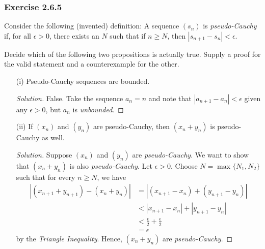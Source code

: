 \subsubsection{Exercise 2.6.5} Consider the following (invented) definition: A sequence \((s_n)\) is \textit{pseudo-Cauchy} if, for all \(\epsilon > 0\), there exists an \(N \) such that if \(n \geq N \), then \( |s_{n+1} - s_n | < \epsilon\). 

Decide which of the following two propositions is actually true. Supply a proof for the valid statement and a counterexample for the other.
\begin{enumerate}
    \item[(i)] Pseudo-Cauchy sequences are bounded. 
        \begin{proof}[Solution]
            False. Take the sequence \(a_n = n \) and note that \( |a_{n+1} - a_n| < \epsilon\) given any \(\epsilon > 0 \), but \(a_n \) is \textit{unbounded}.
        \end{proof}
    \item[(ii)] If \((x_n)\) and \((y_n)\) are pseudo-Cauchy, then \((x_n + y_n)\) is pseudo-Cauchy as well. 
    \begin{proof}[Solution]
        Suppose \((x_n)\) and \((y_n)\) are \textit{pseudo-Cauchy}. We want to show that \((x_n + y_n)\) is also \textit{pseudo-Cauchy}. Let \(\epsilon > 0\). Choose \( N = \max \{ N_1, N_2 \}\) such that for every \( n \geq N \), we have 
        \begin{align*}
            |(x_{n+1} + y_{n+1}) - (x_n + y_n)| &= |(x_{n+1} - x_n) + (y_{n+1} - y_n) | \\
                                                &< |x_{n+1} - x_n| + |y_{n+1} - y_n| \\
                                                &< \frac{\epsilon}{2} + \frac{\epsilon}{2} \\
                                                &= \epsilon
        \end{align*}
        by the \textit{Triangle Inequality}.
        Hence, \((x_n + y_n)\) are \textit{pseudo-Cauchy}.
    \end{proof}
\end{enumerate}

